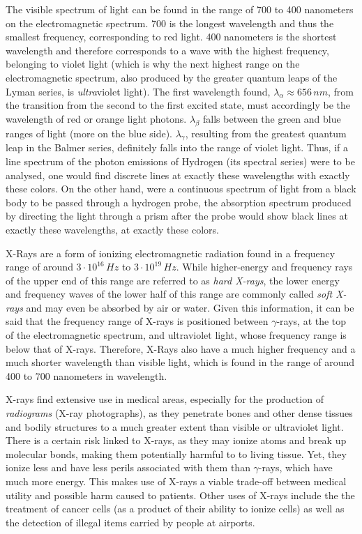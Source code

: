The visible spectrum of light can be found in the range of 700 to 400 nanometers on the electromagnetic spectrum. 700 is the longest wavelength and thus the smallest frequency, corresponding to red light. 400 nanometers is the shortest wavelength and therefore corresponds to a wave with the highest frequency, belonging to violet light (which is why the next highest range on the electromagnetic spectrum, also produced by the greater quantum leaps of the Lyman series, is \emph{ultra}violet light). The first wavelength found, $\lambda_\alpha \approx 656\, nm$, from the transition from the second to the first excited state, must accordingly be the wavelength of red or orange light photons. $\lambda_\beta$ falls between the green and blue ranges of light (more on the blue side). $\lambda_\gamma$, resulting from the greatest quantum leap in the Balmer series, definitely falls into the range of violet light. Thus, if a line spectrum of the photon emissions of Hydrogen (its spectral series) were to be analysed, one would find discrete lines at exactly these wavelengths with exactly these colors. On the other hand, were a continuous spectrum of light from a black body to be passed through a hydrogen probe, the absorption spectrum produced by directing the light through a prism after the probe would show black lines at exactly these wavelengths, at exactly these colors.



X-Rays are a form of ionizing electromagnetic radiation found in a frequency range of around $3 \cdot 10^{16}\, Hz$ to $3 \cdot 10^{19}\, Hz$. While higher-energy and frequency rays of the upper end of this range are referred to as \emph{hard X-rays}, the lower energy and frequency waves of the lower half of this range are commonly called \emph{soft X-rays} and may even be absorbed by air or water. Given this information, it can be said that the frequency range of X-rays is positioned between $\gamma$-rays, at the top of the electromagnetic spectrum, and ultraviolet light, whose frequency range is below that of X-rays. Therefore, X-Rays also have a much higher frequency and a much shorter wavelength than visible light, which is found in the range of around 400 to 700 nanometers in wavelength.

X-rays find extensive use in medical areas, especially for the production of \emph{radiograms} (X-ray photographs), as they penetrate bones and other dense tissues and bodily structures to a much greater extent than visible or ultraviolet light. There is a certain risk linked to X-rays, as they may ionize atoms and break up molecular bonds, making them potentially harmful to to living tissue. Yet, they ionize less and have less perils associated with them than $\gamma$-rays, which have much more energy. This makes use of X-rays a viable trade-off between medical utility and possible harm caused to patients. Other uses of X-rays include the the treatment of cancer cells (as a product of their ability to ionize cells) as well as the detection of illegal items carried by people at airports.

